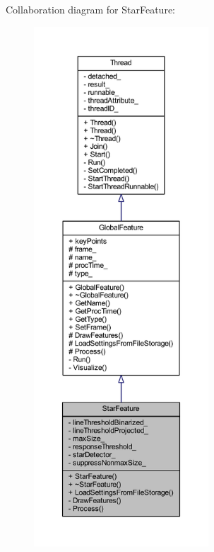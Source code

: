 Collaboration diagram for Star\-Feature\-:
\nopagebreak
\begin{figure}[H]
\begin{center}
\leavevmode
\includegraphics[height=550pt]{class_star_feature__coll__graph}
\end{center}
\end{figure}
